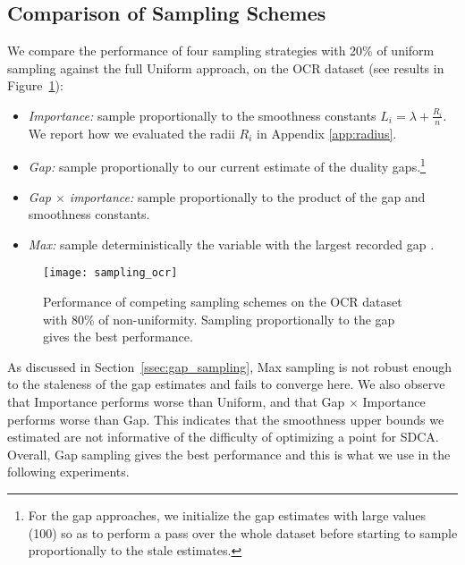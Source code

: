 \subsection{Comparison of Sampling Schemes} \label{experiment sampling}
We compare the performance of four sampling strategies with 20\% of uniform sampling against the full Uniform approach, on the OCR dataset (see results in Figure~\ref{fig:comparison sampling schemes}):\vspace{-2mm}
\begin{itemize}
  \item \textit{Importance:} sample proportionally to the smoothness constants $L_i = \lambda +\frac{R_i}{n}$. We report how we evaluated the radii $R_i$ in Appendix \ref{app:radius}. \vspace{-2mm}
  \item \textit{Gap:} sample proportionally to our current estimate of the duality gaps.\footnote{
  For the gap approaches, we initialize the gap estimates with large values (100) so as to perform a pass over the whole dataset before starting to sample proportionally to the stale estimates.
  } \vspace{-2mm}
  \item \textit{Gap $\times$ importance:} sample proportionally to the product of the gap and smoothness constants. \vspace{-2mm}
  \item \textit{Max:} sample deterministically the variable with the largest recorded gap \citep{dunner2017efficient}.
\end{itemize}
\begin{figure}[t]
\centering \texttt{[image: sampling\_ocr]}
\caption[
	Performance of competing sampling schemes on the OCR dataset 
]{
	Performance of competing sampling schemes on the OCR dataset with 80\% of non-uniformity. Sampling proportionally to the gap gives the best performance.
}
\label{fig:comparison sampling schemes}
\end{figure}

As discussed in Section~\ref{ssec:gap_sampling}, Max sampling is not robust enough to the staleness of the gap estimates and fails to converge here.
We also observe that Importance performs worse than Uniform, and that Gap $\times$ Importance performs worse than Gap.
This  indicates that the smoothness upper bounds we estimated are not informative of the  difficulty of optimizing a point for SDCA.
Overall, Gap sampling  gives the best performance and this is what we use in the following experiments.


